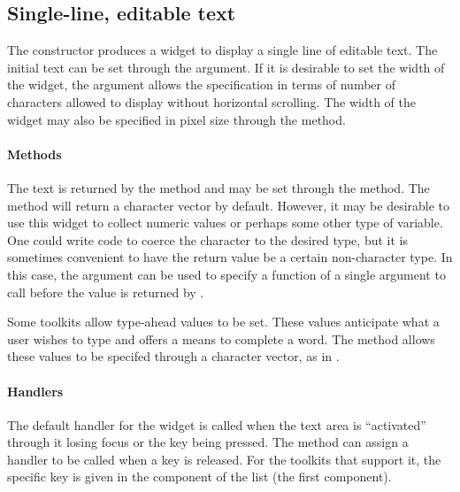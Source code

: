\subsection{Single-line, editable text}
\label{sec:gWidgets-single-line-editable}

The  constructor produces a widget to display a
single line of editable text. The initial text can be set through the
 argument. 
If it is desirable to set the width of the widget, the
 argument allows the specification in terms of
number of characters allowed to display without horizontal scrolling. The width
of the widget may also be specified in pixel size through the
 method.


\paragraph{Methods}
The text is returned by the
 method and may be set through the
 method.
The  method will return a character vector by
default. However, it may be desirable to use this widget to collect
numeric values or perhaps some other type of variable. One could write
code to coerce the character to the desired type, but it is sometimes
convenient to have the return value be a certain non-character
type. In this case, the  argument can be
used to specify a function of a single argument to call before the
value is returned by .

Some toolkits allow type-ahead values to be set. These values
anticipate what a user wishes to type and offers a means to complete a
word. The \method{[\ASSIGN}{gedit} method allows these values to be
specifed through a character vector, as in .



\paragraph{Handlers}
The default handler for the  widget is called when
the text area is ``activated'' through it losing focus or the
 key being pressed. The
 method can assign a handler to be
called when a key is released. For the toolkits that support it, the
specific key is given in the  component of the list  (the first component).

